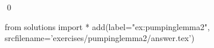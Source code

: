 
\begin{ex} 
  \label{ex:pumpinglemma2}
  
  \qed
\end{ex} 
\begin{python0}
from solutions import *
add(label="ex:pumpinglemma2",
    srcfilename='exercises/pumpinglemma2/answer.tex') 
\end{python0}

